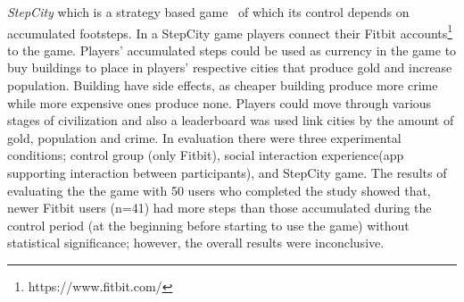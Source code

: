 \emph{StepCity} which is a strategy based game~\citep{walsh2014stepcity} of which its control depends on accumulated footsteps. In a StepCity game players connect their Fitbit accounts\footnote{https://www.fitbit.com/} to the game. Players' accumulated steps could be used as currency in the game to buy buildings to place in players' respective cities that produce gold and increase population. Building have side effects, as cheaper building produce more crime while more expensive ones produce none. Players could move through various stages of civilization and also a leaderboard was used link cities by the amount of gold, population and crime. In evaluation there were three experimental conditions; control group (only Fitbit), social interaction experience(app supporting interaction between participants), and StepCity game. The results of evaluating the the game with 50 users who completed the study showed that, newer Fitbit users (n=41) had more steps than those accumulated during the control period (at the beginning before starting to use the game) without statistical significance; however, the overall results were inconclusive.  

